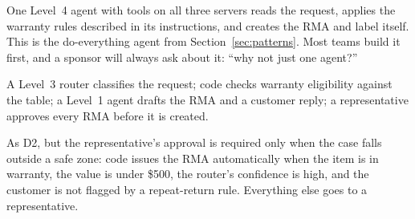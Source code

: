 \begin{description}[leftmargin=1em,itemsep=2pt]
  \item[D1, single returns agent.] One Level~4 agent with tools on all three servers reads the request, applies the warranty rules described in its instructions, and creates the RMA and label itself. This is the do-everything agent from Section~\ref{sec:patterns}. Most teams build it first, and a sponsor will always ask about it: ``why not just one agent?''
  \item[D2, rep-reviewed workflow.] A Level~3 router classifies the request; code checks warranty eligibility against the table; a Level~1 agent drafts the RMA and a customer reply; a representative approves every RMA before it is created.
  \item[D3, straight-through with exceptions.] As D2, but the representative's approval is required only when the case falls outside a safe zone: code issues the RMA automatically when the item is in warranty, the value is under \$500, the router's confidence is high, and the customer is not flagged by a repeat-return rule. Everything else goes to a representative.
\end{description}

